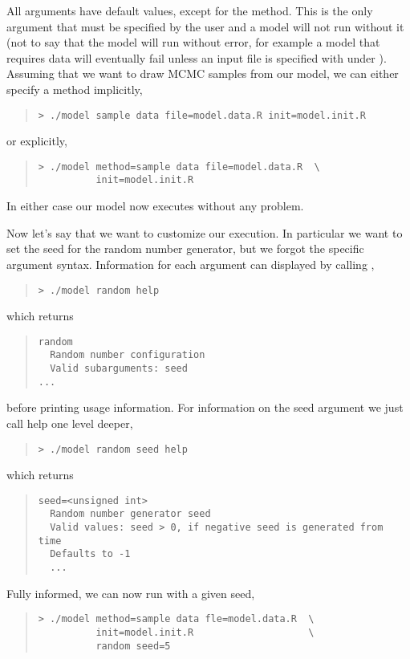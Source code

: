 All \Stan arguments have default values, except for the method.  This
is the only argument that must be specified by the user and a model
will not run without it (not to say that the model will run without error,
for example a model that requires data will eventually fail unless an input file 
is specified with  under ).  Assuming that we want to draw
MCMC samples from our model, we can either specify a method
implicitly,
%
\begin{quote}
\begin{Verbatim}[fontshape=sl]
> ./model sample data file=model.data.R init=model.init.R
\end{Verbatim}
\end{quote}
%
or explicitly,
%
\begin{quote}
\begin{Verbatim}[fontshape=sl]
> ./model method=sample data file=model.data.R  \
          init=model.init.R
\end{Verbatim}
\end{quote}
%
In either case our model now executes without any problem.

Now let's say that we want to customize our execution.  In
particular we want to set the seed for the random number generator,
but we forgot the specific argument syntax.  Information for each
argument can displayed by calling \code{help},
%
\begin{quote}
\begin{Verbatim}[fontshape=sl]
> ./model random help
\end{Verbatim}
\end{quote}
%
which returns
%
\begin{quote}
\begin{Verbatim}
random
  Random number configuration
  Valid subarguments: seed
...
\end{Verbatim}
\end{quote}
%
before printing usage information.  For information on the 
seed argument we just call help one level deeper,
%
\begin{quote}
\begin{Verbatim}[fontshape=sl]
> ./model random seed help
\end{Verbatim}
\end{quote}
%
which returns
%
\begin{quote}
\begin{Verbatim}
seed=<unsigned int>
  Random number generator seed
  Valid values: seed > 0, if negative seed is generated from time
  Defaults to -1
  ...
\end{Verbatim}
\end{quote}
%
Fully informed, we can now run with a given seed,
%
\begin{quote}
\begin{Verbatim}[fontshape=sl]
> ./model method=sample data fle=model.data.R  \
          init=model.init.R                    \
          random seed=5
\end{Verbatim}
\end{quote}


